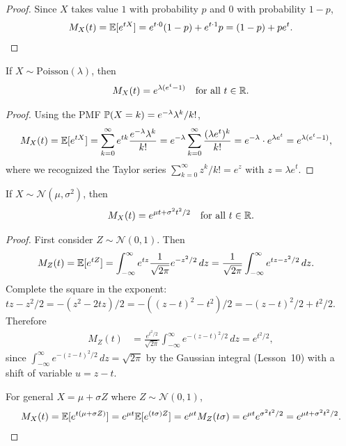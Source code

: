 \documentclass[11pt,a4paper]{article}
\begin{document}
\begin{proof}
Since $X$ takes value $1$ with probability $p$ and $0$ with
probability $1-p$,
\[
    M_X(t) = \mathbb{E}[e^{tX}] = e^{t \cdot 0}(1-p) + e^{t \cdot 1} p
    = (1-p) + pe^t. \qedhere
\]
\end{proof}

\begin{proposition}
\label{prop:mgf_poisson}
If $X \sim \mathrm{Poisson}(\lambda)$, then
\[
    M_X(t) = e^{\lambda(e^t - 1)} \quad \text{for all } t \in \mathbb{R}.
\]
\end{proposition}

\begin{proof}
Using the PMF $\mathbb{P}(X = k) = e^{-\lambda} \lambda^k / k!$,
\begin{align*}
    M_X(t) &= \mathbb{E}[e^{tX}] = \sum_{k=0}^\infty e^{tk}
    \frac{e^{-\lambda} \lambda^k}{k!}
    = e^{-\lambda} \sum_{k=0}^\infty \frac{(\lambda e^t)^k}{k!}
    = e^{-\lambda} \cdot e^{\lambda e^t}
    = e^{\lambda(e^t - 1)},
\end{align*}
where we recognized the Taylor series
$\sum_{k=0}^\infty z^k / k! = e^z$ with $z = \lambda e^t$.
\end{proof}

\begin{proposition}
\label{prop:mgf_normal}
If $X \sim \mathcal{N}(\mu, \sigma^2)$, then
\[
    M_X(t) = e^{\mu t + \sigma^2 t^2 / 2}
    \quad \text{for all } t \in \mathbb{R}.
\]
\end{proposition}

\begin{proof}
First consider $Z \sim \mathcal{N}(0, 1)$. Then
\begin{align*}
    M_Z(t) &= \mathbb{E}[e^{tZ}]
    = \int_{-\infty}^{\infty} e^{tz} \frac{1}{\sqrt{2\pi}}
    e^{-z^2/2} \, dz
    = \frac{1}{\sqrt{2\pi}} \int_{-\infty}^{\infty}
    e^{tz - z^2/2} \, dz.
\end{align*}
Complete the square in the exponent:
$tz - z^2/2 = -(z^2 - 2tz)/2 = -((z-t)^2 - t^2)/2
= -(z-t)^2/2 + t^2/2$.
Therefore
\begin{align*}
    M_Z(t) &= \frac{e^{t^2/2}}{\sqrt{2\pi}}
    \int_{-\infty}^{\infty} e^{-(z-t)^2/2} \, dz
    = e^{t^2/2},
\end{align*}
since $\int_{-\infty}^{\infty} e^{-(z-t)^2/2}\,dz = \sqrt{2\pi}$
by the Gaussian integral (Lesson~10) with a shift of variable
$u = z - t$.

For general $X = \mu + \sigma Z$ where $Z \sim \mathcal{N}(0,1)$,
\[
    M_X(t) = \mathbb{E}[e^{t(\mu + \sigma Z)}]
    = e^{\mu t} \mathbb{E}[e^{(t\sigma) Z}]
    = e^{\mu t} M_Z(t\sigma)
    = e^{\mu t} e^{\sigma^2 t^2/2}
    = e^{\mu t + \sigma^2 t^2/2}. \qedhere
\]
\end{proof}
\end{document}
